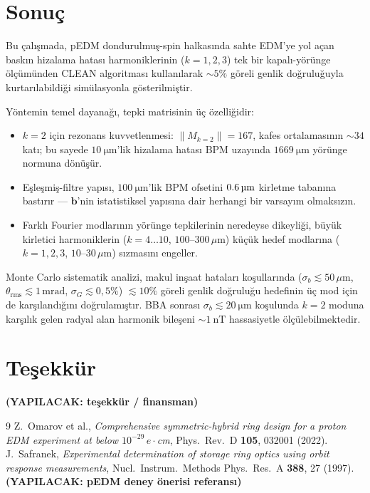 \documentclass[preprint,12pt]{elsarticle}
\newcommand{\todo}[1]{{\color{red}\textbf{(YAPILACAK: #1)}}}
\begin{document}
\section{Sonuç}
\label{sec:sonuc}

Bu çalışmada, pEDM dondurulmuş-spin halkasında sahte EDM'ye yol açan baskın
hizalama hatası harmoniklerinin ($k=1,2,3$) tek bir kapalı-yörünge ölçümünden
CLEAN algoritması kullanılarak $\sim5\%$ göreli genlik doğruluğuyla
kurtarılabildiği simülasyonla gösterilmiştir.

Yöntemin temel dayanağı, tepki matrisinin üç özelliğidir:
\begin{itemize}
  \item $k=2$ için rezonans kuvvetlenmesi: $\|M_{k=2}\|=167$, kafes
    ortalamasının $\sim34$ katı; bu sayede $\SI{10}{\micro\meter}$'lik
    hizalama hatası BPM uzayında $\SI{1669}{\micro\meter}$ yörünge normuna dönüşür.
  \item Eşleşmiş-filtre yapısı, $\SI{100}{\micro\meter}$'lik BPM ofsetini
    $\SI{0{,}6}{\micro\meter}$ kirletme tabanına bastırır —
    $\mathbf{b}$'nin istatistiksel yapısına dair herhangi bir varsayım olmaksızın.
  \item Farklı Fourier modlarının yörünge tepkilerinin neredeyse dikeyliği,
    büyük kirletici harmoniklerin ($k=4\ldots10$, $100$--$300\,\mu$m) küçük
    hedef modlarına ($k=1,2,3$, $10$--$30\,\mu$m) sızmasını engeller.
\end{itemize}

Monte Carlo sistematik analizi, makul inşaat hataları koşullarında
($\sigma_b\lesssim50\,\mu$m, $\theta_\mathrm{rms}\lesssim1\,\mathrm{mrad}$,
$\sigma_G\lesssim0{,}5\%$) $\lesssim10\%$ göreli genlik doğruluğu hedefinin
üç mod için de karşılandığını doğrulamıştır. BBA sonrası
$\sigma_b\lesssim\SI{20}{\micro\meter}$ koşulunda $k=2$ moduna karşılık gelen
radyal alan harmonik bileşeni $\sim\SI{1}{\nano\tesla}$ hassasiyetle
ölçülebilmektedir.

\section*{Teşekkür}
\todo{teşekkür / finansman}

\begin{thebibliography}{9}
 Z.~Omarov et al., \emph{Comprehensive symmetric-hybrid
ring design for a proton EDM experiment at below $10^{-29}\,e\cdot$cm},
Phys.\ Rev.\ D \textbf{105}, 032001 (2022).
 J.~Safranek, \emph{Experimental determination of storage
ring optics using orbit response measurements},
Nucl.\ Instrum.\ Methods Phys.\ Res.\ A \textbf{388}, 27 (1997).
 \todo{pEDM deney önerisi referansı}
\end{thebibliography}
\end{document}
